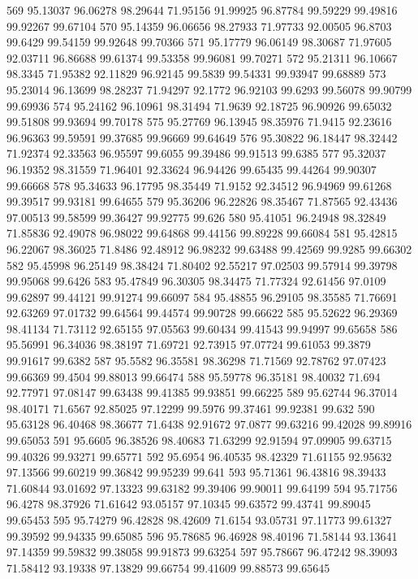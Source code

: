 569	95.13037	96.06278	98.29644	71.95156	91.99925	96.87784	99.59229	99.49816	99.92267	99.67104
570	95.14359	96.06656	98.27933	71.97733	92.00505	96.8703	99.6429	99.54159	99.92648	99.70366
571	95.17779	96.06149	98.30687	71.97605	92.03711	96.86688	99.61374	99.53358	99.96081	99.70271
572	95.21311	96.10667	98.3345	71.95382	92.11829	96.92145	99.5839	99.54331	99.93947	99.68889
573	95.23014	96.13699	98.28237	71.94297	92.1772	96.92103	99.6293	99.56078	99.90799	99.69936
574	95.24162	96.10961	98.31494	71.9639	92.18725	96.90926	99.65032	99.51808	99.93694	99.70178
575	95.27769	96.13945	98.35976	71.9415	92.23616	96.96363	99.59591	99.37685	99.96669	99.64649
576	95.30822	96.18447	98.32442	71.92374	92.33563	96.95597	99.6055	99.39486	99.91513	99.6385
577	95.32037	96.19352	98.31559	71.96401	92.33624	96.94426	99.65435	99.44264	99.90307	99.66668
578	95.34633	96.17795	98.35449	71.9152	92.34512	96.94969	99.61268	99.39517	99.93181	99.64655
579	95.36206	96.22826	98.35467	71.87565	92.43436	97.00513	99.58599	99.36427	99.92775	99.626
580	95.41051	96.24948	98.32849	71.85836	92.49078	96.98022	99.64868	99.44156	99.89228	99.66084
581	95.42815	96.22067	98.36025	71.8486	92.48912	96.98232	99.63488	99.42569	99.9285	99.66302
582	95.45998	96.25149	98.38424	71.80402	92.55217	97.02503	99.57914	99.39798	99.95068	99.6426
583	95.47849	96.30305	98.34475	71.77324	92.61456	97.0109	99.62897	99.44121	99.91274	99.66097
584	95.48855	96.29105	98.35585	71.76691	92.63269	97.01732	99.64564	99.44574	99.90728	99.66622
585	95.52622	96.29369	98.41134	71.73112	92.65155	97.05563	99.60434	99.41543	99.94997	99.65658
586	95.56991	96.34036	98.38197	71.69721	92.73915	97.07724	99.61053	99.3879	99.91617	99.6382
587	95.5582	96.35581	98.36298	71.71569	92.78762	97.07423	99.66369	99.4504	99.88013	99.66474
588	95.59778	96.35181	98.40032	71.694	92.77971	97.08147	99.63438	99.41385	99.93851	99.66225
589	95.62744	96.37014	98.40171	71.6567	92.85025	97.12299	99.5976	99.37461	99.92381	99.632
590	95.63128	96.40468	98.36677	71.6438	92.91672	97.0877	99.63216	99.42028	99.89916	99.65053
591	95.6605	96.38526	98.40683	71.63299	92.91594	97.09905	99.63715	99.40326	99.93271	99.65771
592	95.6954	96.40535	98.42329	71.61155	92.95632	97.13566	99.60219	99.36842	99.95239	99.641
593	95.71361	96.43816	98.39433	71.60844	93.01692	97.13323	99.63182	99.39406	99.90011	99.64199
594	95.71756	96.4278	98.37926	71.61642	93.05157	97.10345	99.63572	99.43741	99.89045	99.65453
595	95.74279	96.42828	98.42609	71.6154	93.05731	97.11773	99.61327	99.39592	99.94335	99.65085
596	95.78685	96.46928	98.40196	71.58144	93.13641	97.14359	99.59832	99.38058	99.91873	99.63254
597	95.78667	96.47242	98.39093	71.58412	93.19338	97.13829	99.66754	99.41609	99.88573	99.65645
